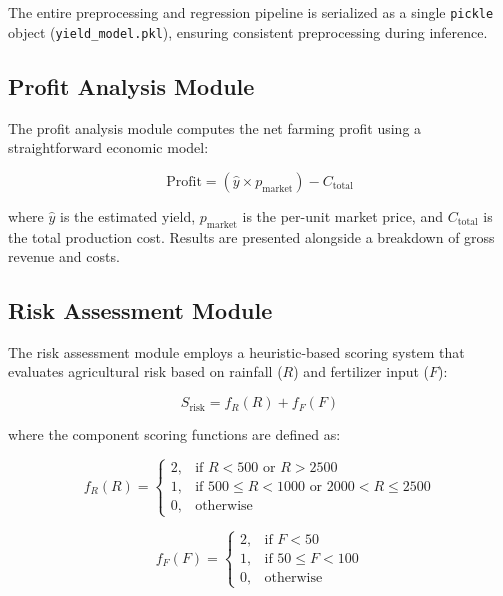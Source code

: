 The entire preprocessing and regression pipeline is serialized as a single \texttt{pickle} object (\texttt{yield\_model.pkl}), ensuring consistent preprocessing during inference.

\subsection{Profit Analysis Module}
The profit analysis module computes the net farming profit using a straightforward economic model:

\begin{equation}
\text{Profit} = (\hat{y} \times p_{\text{market}}) - C_{\text{total}}
\end{equation}

where $\hat{y}$ is the estimated yield, $p_{\text{market}}$ is the per-unit market price, and $C_{\text{total}}$ is the total production cost. Results are presented alongside a breakdown of gross revenue and costs.

\subsection{Risk Assessment Module}
The risk assessment module employs a heuristic-based scoring system that evaluates agricultural risk based on rainfall ($R$) and fertilizer input ($F$):

\begin{equation}
S_{\text{risk}} = f_R(R) + f_F(F)
\end{equation}

where the component scoring functions are defined as:

\begin{equation}
f_R(R) = \begin{cases}
2, & \text{if } R < 500 \text{ or } R > 2500 \\
1, & \text{if } 500 \leq R < 1000 \text{ or } 2000 < R \leq 2500 \\
0, & \text{otherwise}
\end{cases}
\end{equation}

\begin{equation}
f_F(F) = \begin{cases}
2, & \text{if } F < 50 \\
1, & \text{if } 50 \leq F < 100 \\
0, & \text{otherwise}
\end{cases}
\end{equation}

